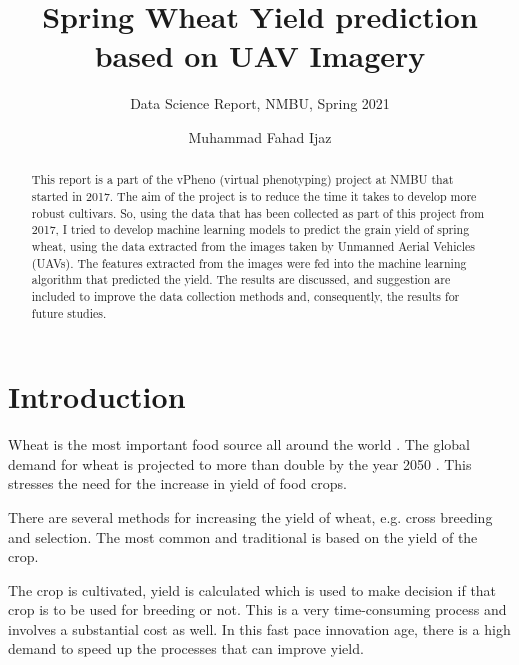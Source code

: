 \documentclass[sigconf, nonacm, natbib, screen, balance=False]{acmart}
\begin{document}
\title{Spring Wheat Yield prediction based on UAV Imagery}
\subtitle{Data Science Report, NMBU, Spring 2021}

\author{Muhammad Fahad Ijaz}

\begin{abstract}
  This report is a part of the vPheno (virtual phenotyping) project at NMBU that started in 2017. The aim of the project is to reduce the time it takes to develop more robust cultivars. So, using the data that has been collected as part of this project from 2017, I tried to develop machine learning models to predict the grain yield of spring wheat, using the data extracted from the images taken by Unmanned Aerial Vehicles (UAVs). The features extracted from the images were fed into the machine learning algorithm that predicted the yield. The results are discussed, and suggestion are included to improve the data collection methods and, consequently, the results for future studies.
\end{abstract}


\maketitle

\section{Introduction}\label{sec:intro}

Wheat is the most important food source all around the world \cite{Igrejas2020}. The global demand for wheat is projected to more than double by the year 2050 \cite{tilman}. This stresses the need for the increase in yield of food crops.

There are several methods for increasing the yield of wheat, e.g. cross breeding and selection. The most common and traditional is based on the yield of the crop.

The crop is cultivated, yield is calculated which is used to make decision if that crop is to be used for breeding or not. This is a very time-consuming process and involves a substantial cost as well. In this fast pace innovation age, there is a high demand to speed up the processes that can improve yield.
\end{document}
